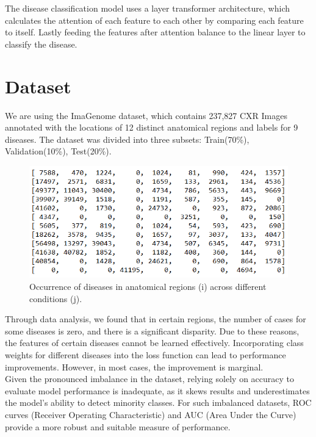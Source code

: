 \documentclass[10pt,twocolumn,letterpaper]{article}
\begin{document}
The disease classification model uses a layer transformer architecture\cite{2002.04745}, which calculates the attention of each feature to each other by comparing each feature to itself. Lastly feeding the features after attention balance to the linear layer to classify the disease.

\section{Dataset}
We are using the ImaGenome dataset, which contains 237,827 CXR Images annotated with the locations of 12 distinct anatomical regions and labels for 9 diseases. The dataset was divided into three subsets: Train(70\%), Validation(10\%), Test(20\%).\\


\begin{figure}[H]
    \centering
    \includegraphics[width=1\linewidth]{assets/dataset.png}
    \caption{Occurrence of diseases in anatomical regions (i) across different conditions (j).}
    \label{fig:enter-label}
\end{figure}

Through data analysis, we found that in certain regions, the number of cases for some diseases is zero, and there is a significant disparity. Due to these reasons, the features of certain diseases cannot be learned effectively. Incorporating class weights for different diseases into the loss function \cite{1708.02002} can lead to performance improvements. However, in most cases, the improvement is marginal.\\

Given the pronounced imbalance in the dataset, relying solely on accuracy to evaluate model performance is inadequate, as it skews results and underestimates the model’s ability to detect minority classes. For such imbalanced datasets, ROC curves (Receiver Operating Characteristic) and AUC (Area Under the Curve) provide a more robust and suitable measure of performance.
\end{document}
